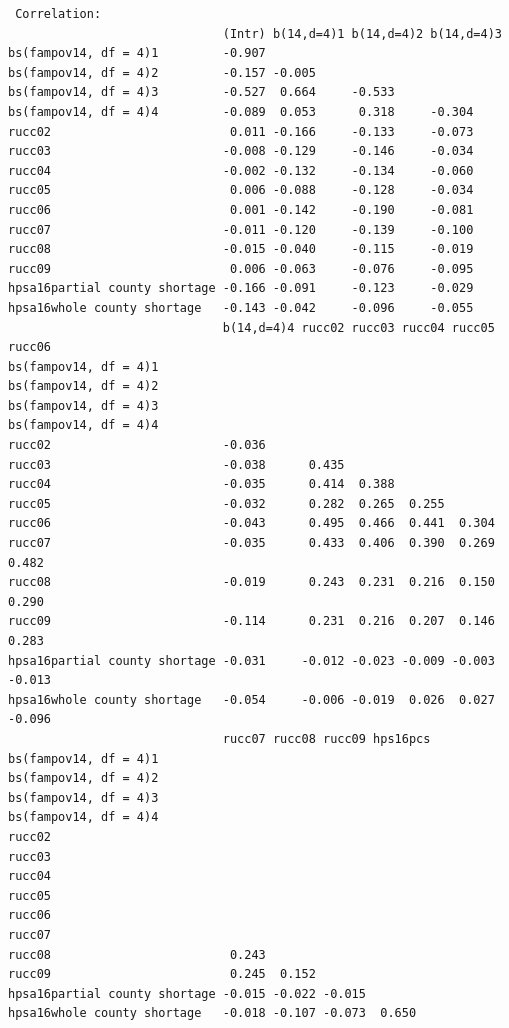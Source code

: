 \documentclass[
  letterpaper,
  DIV=11,
  numbers=noendperiod]{scrreprt}
\begin{document}
\begin{verbatim}
 Correlation: 
                              (Intr) b(14,d=4)1 b(14,d=4)2 b(14,d=4)3
bs(fampov14, df = 4)1         -0.907                                 
bs(fampov14, df = 4)2         -0.157 -0.005                          
bs(fampov14, df = 4)3         -0.527  0.664     -0.533               
bs(fampov14, df = 4)4         -0.089  0.053      0.318     -0.304    
rucc02                         0.011 -0.166     -0.133     -0.073    
rucc03                        -0.008 -0.129     -0.146     -0.034    
rucc04                        -0.002 -0.132     -0.134     -0.060    
rucc05                         0.006 -0.088     -0.128     -0.034    
rucc06                         0.001 -0.142     -0.190     -0.081    
rucc07                        -0.011 -0.120     -0.139     -0.100    
rucc08                        -0.015 -0.040     -0.115     -0.019    
rucc09                         0.006 -0.063     -0.076     -0.095    
hpsa16partial county shortage -0.166 -0.091     -0.123     -0.029    
hpsa16whole county shortage   -0.143 -0.042     -0.096     -0.055    
                              b(14,d=4)4 rucc02 rucc03 rucc04 rucc05 rucc06
bs(fampov14, df = 4)1                                                      
bs(fampov14, df = 4)2                                                      
bs(fampov14, df = 4)3                                                      
bs(fampov14, df = 4)4                                                      
rucc02                        -0.036                                       
rucc03                        -0.038      0.435                            
rucc04                        -0.035      0.414  0.388                     
rucc05                        -0.032      0.282  0.265  0.255              
rucc06                        -0.043      0.495  0.466  0.441  0.304       
rucc07                        -0.035      0.433  0.406  0.390  0.269  0.482
rucc08                        -0.019      0.243  0.231  0.216  0.150  0.290
rucc09                        -0.114      0.231  0.216  0.207  0.146  0.283
hpsa16partial county shortage -0.031     -0.012 -0.023 -0.009 -0.003 -0.013
hpsa16whole county shortage   -0.054     -0.006 -0.019  0.026  0.027 -0.096
                              rucc07 rucc08 rucc09 hps16pcs
bs(fampov14, df = 4)1                                      
bs(fampov14, df = 4)2                                      
bs(fampov14, df = 4)3                                      
bs(fampov14, df = 4)4                                      
rucc02                                                     
rucc03                                                     
rucc04                                                     
rucc05                                                     
rucc06                                                     
rucc07                                                     
rucc08                         0.243                       
rucc09                         0.245  0.152                
hpsa16partial county shortage -0.015 -0.022 -0.015         
hpsa16whole county shortage   -0.018 -0.107 -0.073  0.650  


\end{verbatim}
\end{document}
